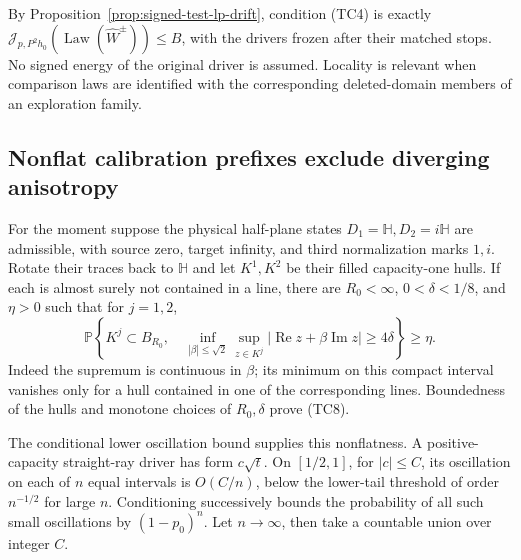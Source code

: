 \documentclass[11pt]{article}
\theoremstyle{definition}\newtheorem{definition}[theorem]{Definition}
\theoremstyle{remark}\newtheorem{remark}[theorem]{Remark}
\begin{document}
By Proposition~\ref{prop:signed-test-lp-drift}, condition (TC4) is
exactly $\mathcal J_{p,P^2h_0}(\operatorname{Law}(\widehat W^\pm))
\le B$, with the drivers frozen after their matched stops. No signed
energy of the original driver is assumed. Locality is relevant when
comparison laws are identified with the corresponding deleted-domain
members of an exploration family.

\subsection{Nonflat calibration prefixes exclude diverging anisotropy}

For the moment suppose the physical half-plane states
$D_1=\mathbb H,D_2=i\mathbb H$ are admissible, with source zero,
target infinity, and third normalization marks $1,i$. Rotate their
traces back to $\mathbb H$ and let $K^1,K^2$ be their filled
capacity-one hulls. If each is almost surely not contained in a line,
there are $R_0<\infty$, $0<\delta<1/8$, and $\eta>0$ such that
for $j=1,2$,
\[
 \mathbb P\left\{K^j\subset B_{R_0},\quad
   \inf_{|\beta|\le\sqrt2}\sup_{z\in K^j}
          |\operatorname{Re}z+\beta\operatorname{Im}z|
                         \ge4\delta\right\}\ge\eta.
 \tag{TC8}
\]
Indeed the supremum is continuous in $\beta$; its minimum on this
compact interval vanishes only for a hull contained in one of the
corresponding lines. Boundedness of the hulls and monotone choices
of $R_0,\delta$ prove (TC8).

The conditional lower oscillation bound supplies this nonflatness.
A positive-capacity straight-ray driver has form $c\sqrt t$.
On $[1/2,1]$, for $|c|\le C$, its oscillation on each of $n$ equal
intervals is $O(C/n)$, below the lower-tail threshold of order
$n^{-1/2}$ for large $n$. Conditioning successively bounds the
probability of all such small oscillations by $(1-p_0)^n$.
Let $n\to\infty$, then take a countable union over integer $C$.
\end{document}
